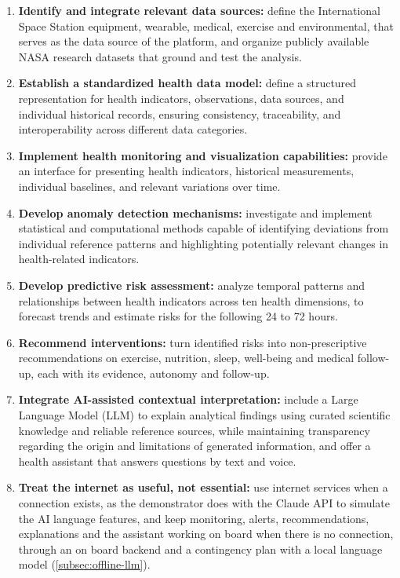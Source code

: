 \begin{enumerate}
\item \textbf{Identify and integrate relevant data sources:} define the International Space Station equipment, wearable, medical, exercise and environmental, that serves as the data source of the platform, and organize publicly available NASA research datasets that ground and test the analysis.

\item \textbf{Establish a standardized health data model:} define a structured representation for health indicators, observations, data sources, and individual historical records, ensuring consistency, traceability, and interoperability across different data categories.

\item \textbf{Implement health monitoring and visualization capabilities:} provide an interface for presenting health indicators, historical measurements, individual baselines, and relevant variations over time.

\item \textbf{Develop anomaly detection mechanisms:} investigate and implement statistical and computational methods capable of identifying deviations from individual reference patterns and highlighting potentially relevant changes in health-related indicators.

\item \textbf{Develop predictive risk assessment:} analyze temporal patterns and relationships between health indicators across ten health dimensions, to forecast trends and estimate risks for the following 24 to 72 hours.

\item \textbf{Recommend interventions:} turn identified risks into non-prescriptive recommendations on exercise, nutrition, sleep, well-being and medical follow-up, each with its evidence, autonomy and follow-up.

\item \textbf{Integrate AI-assisted contextual interpretation:} include a Large Language Model (LLM) to explain analytical findings using curated scientific knowledge and reliable reference sources, while maintaining transparency regarding the origin and limitations of generated information, and offer a health assistant that answers questions by text and voice.

\item \textbf{Treat the internet as useful, not essential:} use internet services when a connection exists, as the demonstrator does with the Claude API to simulate the AI language features, and keep monitoring, alerts, recommendations, explanations and the assistant working on board when there is no connection, through an on board backend and a contingency plan with a local language model (\ref{subsec:offline-llm}).


\end{enumerate}
